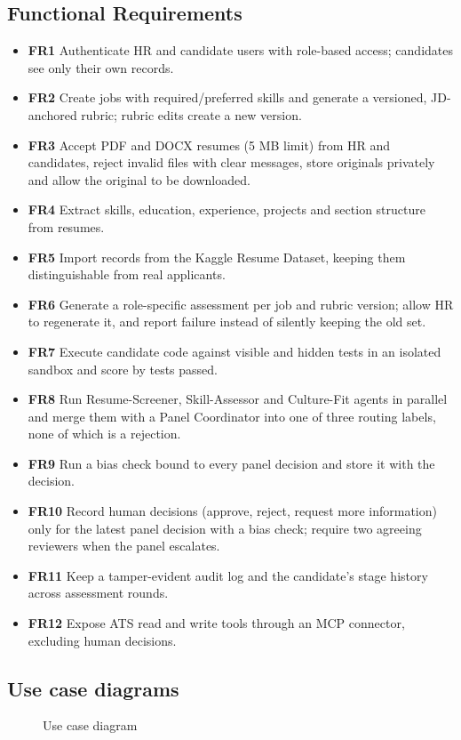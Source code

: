\subsection{Functional Requirements}
\begin{itemize}
\item \textbf{FR1} Authenticate HR and candidate users with role-based access; candidates see only their own records.
\item \textbf{FR2} Create jobs with required/preferred skills and generate a versioned, JD-anchored rubric; rubric edits create a new version.
\item \textbf{FR3} Accept PDF and DOCX resumes (5 MB limit) from HR and candidates, reject invalid files with clear messages, store originals privately and allow the original to be downloaded.
\item \textbf{FR4} Extract skills, education, experience, projects and section structure from resumes.
\item \textbf{FR5} Import records from the Kaggle Resume Dataset, keeping them distinguishable from real applicants.
\item \textbf{FR6} Generate a role-specific assessment per job and rubric version; allow HR to regenerate it, and report failure instead of silently keeping the old set.
\item \textbf{FR7} Execute candidate code against visible and hidden tests in an isolated sandbox and score by tests passed.
\item \textbf{FR8} Run Resume-Screener, Skill-Assessor and Culture-Fit agents in parallel and merge them with a Panel Coordinator into one of three routing labels, none of which is a rejection.
\item \textbf{FR9} Run a bias check bound to every panel decision and store it with the decision.
\item \textbf{FR10} Record human decisions (approve, reject, request more information) only for the latest panel decision with a bias check; require two agreeing reviewers when the panel escalates.
\item \textbf{FR11} Keep a tamper-evident audit log and the candidate's stage history across assessment rounds.
\item \textbf{FR12} Expose ATS read and write tools through an MCP connector, excluding human decisions.
\end{itemize}

\subsection{Use case diagrams}
\begin{figure}[H]\centering
\resizebox{\textwidth}{!}{}
\caption{Use case diagram}\label{fig:usecase}
\end{figure}

